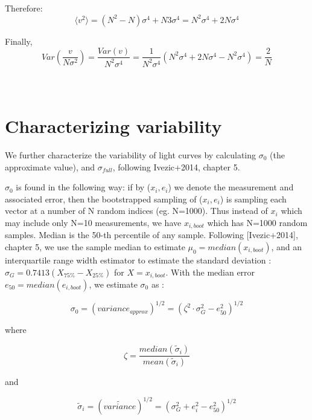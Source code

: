 \documentclass[fleqn,usenatbib]{mnras}  %
\begin{document}
Therefore:
\begin{equation}
\langle v^{2} \rangle = (N^{2}-N) \sigma^{4} + N 3\sigma^{4} = N^{2}\sigma^{4} + 2N\sigma^{4}
\end{equation}

Finally, 
\begin{equation}
Var\left(\frac{v}{N \sigma^{2}}\right) = \frac{Var(v)}{N^{2} \sigma^{4}}  = \frac{1}{N^{2}\sigma^{4}}(N^{2}\sigma^{4} + 2N\sigma^{4}-N^{2}\sigma^{4}) = \frac{2}{N}
\end{equation}



\section{\\ Characterizing variability}
\label{sec:variability}

We further characterize the variability of light curves by calculating $\sigma_{0}$ (the approximate value), and $\sigma_{full}$, following Ivezic+2014, chapter 5. 

$\sigma_{0}$ is found in the following way: if by ($x_{i}, e_{i}$) we denote the measurement and associated error, then the bootstrapped sampling of ($x_{i}, e_{i}$) is sampling each vector at a number of N random indices (eg. N=1000). Thus instead of $x_{i}$ which may include only N=10 measurements, we have $x_{i,boot}$ which has N=1000 random samples. Median is the 50-th percentile of any sample.  Following [Ivezic+2014], chapter 5, we use the sample median to estimate $\mu_{0} = median(x_{i,boot})$, and an interquartile range width estimator to estimate the standard deviation : $\sigma_{G} =0.7413 (X_{75\%} - X_{25\%}) $ for $X = x_{i,boot}$.
With the median error $e_{50} = median(e_{i,boot})$, we estimate $\sigma_{0}$ as : 

\begin{equation}
\sigma_{0} = ( variance_{approx} )^{1/2} = (\zeta^{2} \cdot \sigma_{G}^{2} - e_{50} ^ {2})^{1/2}
\end{equation}

where 

\begin{equation}
\zeta = \frac{median(\widetilde{\sigma}_{i})} {mean(\widetilde{\sigma}_{i})}
\end{equation}

and 

\begin{equation}
\widetilde{\sigma}_{i} =  ( \widetilde{variance} )^{1/2} = ( \sigma_{G}^{2} + e_{i}^{2} - e_{50}^{2} )^{1/2}
\end{equation}
\end{document}
